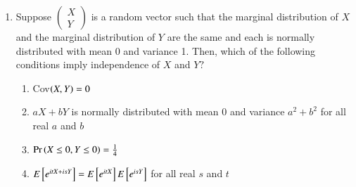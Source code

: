 \begin{enumerate}[label=\thesection.\arabic*.,ref=\thesection.\theenumi]
\item Suppose
$\begin{pmatrix}
X\\
Y
\end{pmatrix}$ is a random vector such that the marginal distribution of $X$ and the marginal distribution of $Y$ are the same and each is normally distributed with mean 0 and variance 1. Then, which of the following conditions imply independence of $X$ and $Y?$
\begin{enumerate}
\item Cov$\left(X,Y\right)=0$
\item $aX+bY$ is normally distributed with mean 0 and variance $a^2+b^2$ for all real $a$ and $b$
\item $\Pr\left(X\le 0, Y\le0\right)=\frac{1}{4}$
\item $E{}\left[e^{itX+isY}\right]=E{}\left[e^{itX}\right]E{}\left[e^{isY}\right]$ for all real $s$ and $t$
\end{enumerate}
%
\solution


\end{enumerate}